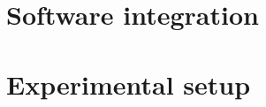 

\section{Software integration}
    \label{sec:software_implementation_selection}
    

\section{Experimental setup}
    \label{sec:experimental_setup}
    